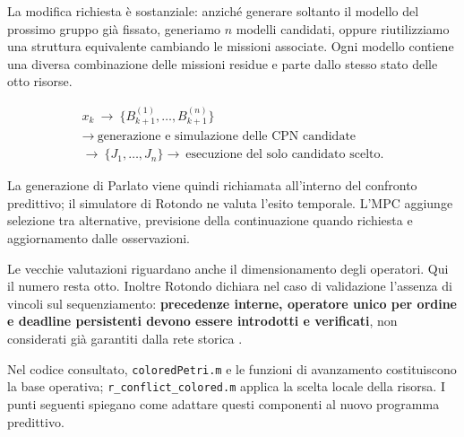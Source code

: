 La modifica richiesta è sostanziale: anziché generare soltanto il modello del prossimo gruppo già fissato, generiamo $n$ modelli candidati, oppure riutilizziamo una struttura equivalente cambiando le missioni associate. Ogni modello contiene una diversa combinazione delle missioni residue e parte dallo stesso stato delle otto risorse.

\[
\begin{gathered}
 x_k\ \longrightarrow\ \{B_{k+1}^{(1)},\ldots,B_{k+1}^{(n)}\}\\
 \longrightarrow\ \text{generazione e simulazione delle CPN candidate}\\
 \longrightarrow\ \{J_1,\ldots,J_n\}
 \longrightarrow\ \text{esecuzione del solo candidato scelto}.
\end{gathered}
\]

La generazione di Parlato viene quindi richiamata all'interno del confronto predittivo; il simulatore di Rotondo ne valuta l'esito temporale. L'MPC aggiunge selezione tra alternative, previsione della continuazione quando richiesta e aggiornamento dalle osservazioni.

Le vecchie valutazioni riguardano anche il dimensionamento degli operatori. Qui il numero resta otto. Inoltre Rotondo dichiara nel caso di validazione l'assenza di vincoli sul sequenziamento: \textbf{precedenze interne, operatore unico per ordine e deadline persistenti devono essere introdotti e verificati}, non considerati già garantiti dalla rete storica \cite[sezione 3.1, pp. 33--34]{Rotondo}.

Nel codice consultato, \texttt{coloredPetri.m} e le funzioni di avanzamento costituiscono la base operativa; \texttt{r\_conflict\_colored.m} applica la scelta locale della risorsa. I punti seguenti spiegano come adattare questi componenti al nuovo programma predittivo.

